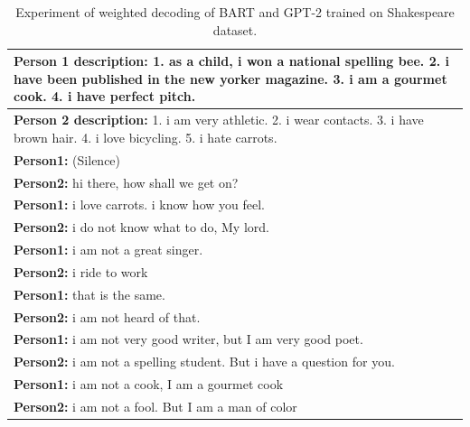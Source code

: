 \begin{table}[ht]
\centering
 \begin{tabular}{|p{14cm}|} 
 \hline\hline
 \textbf{Person 1 description:} 1. as a child, i won a national spelling bee. 2. i have been published in the new yorker magazine. 3. i am a gourmet cook. 4. i have perfect pitch. \\
 \hline
 \textbf{Person 2 description:} 1. i am very athletic. 2. i wear contacts. 3. i have brown hair. 4. i love bicycling. 5. i hate carrots. \\
 \hline\hline
 \textbf{Person1:} (Silence) \\
 \textbf{Person2:} hi there, how shall we get on?  \\ 
 \textbf{Person1:} i love carrots. i know how you feel. \\
 \textbf{Person2:} i do not know what to do, My lord. \\
 \textbf{Person1:} i am not a great singer. \\
 \textbf{Person2:} i ride to work \\
 \textbf{Person1:} that is the same. \\
 \textbf{Person2:} i am not heard of that. \\
 \textbf{Person1:} i am not very good writer, but I am very good poet. \\
 \textbf{Person2:} i am not a spelling student. But i have a question for you. \\
 \textbf{Person1:} i am not a cook, I am a gourmet cook \\
 \textbf{Person2:} i am not a fool. But I am a man of color  \\
 \hline\hline
 \end{tabular}
 \caption{Experiment of weighted decoding of BART and GPT-2 trained on Shakespeare dataset.}
\label{tab:poetic_shakespear}
\end{table}

